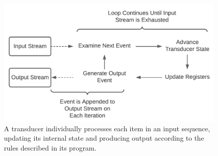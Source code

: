 \begin{figure}[t]
  \centering
  \includegraphics[scale=.6]{images/processing}
  \caption{A transducer individually processes each item in an input
  sequence, updating its internal state and producing output according
  to the rules described in its program.}
  \label{fig:Processing}
\end{figure}

